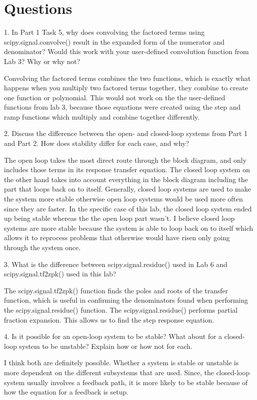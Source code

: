 \documentclass[12pt]{report}
\begin{document}
\section{Questions}
1. In Part 1 Task 5, why does convolving the factored terms using scipy.signal.convolve()
result in the expanded form of the numerator and denominator? Would this work with your
user-defined convolution function from Lab 3? Why or why not?

Convolving the factored terms combines the two functions, which is exactly what happens
when you multiply two factored terms together, they combine to create one function or
polynomial. This would not work on the the user-defined functions from lab 3, because
those equations were created using the step and ramp functions which multiply and combine
together differently.

2. Discuss the difference between the open- and closed-loop systems from Part 1 and Part 
2. How does stability differ for each case, and why?

The open loop takes the most direct route through the block diagram, and only includes
those terms in its response transfer equation. The closed loop system on the other hand
takes into account everything in the block diagram including the part that loops back on
to itself. Generally, closed loop systems are used to make the system more stable
otherwise open loop systems would be used more often since they are faster. In the
specific case of this lab, the closed loop system ended up being stable whereas the
the open loop part wasn't. I believe closed loop systems are more stable because
the system is able to loop back on to itself which allows it to reprocess problems
that otherwise would have risen only going through the system once.

3. What is the difference between scipy.signal.residue() used in Lab 6 and
scipy.signal.tf2zpk() used in this lab?

The scipy.signal.tf2zpk() function finds the poles and roots of the transfer function,
which is useful in confirming the denominators found when performing the
scipy.signal.residue() function.
The scipy.signal.residue() performs partial fraction expansion. This allows us to find
the step response equation.

4. Is it possible for an open-loop system to be stable? What about for a closed-loop 
system to be unstable? Explain how or how not for each.

I think both are definitely possible. Whether a system is stable or unstable is more
dependent on the different subsystems that are used. Since, the closed-loop system usually
involves a feedback path, it is more likely to be stable because of how the equation for
a feedback is setup.
\end{document}
